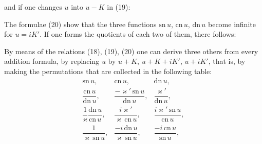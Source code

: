 and if one changes $u$ into $u - K$ in (19):

The formulae (20) show that the three functions $\mathrm{sn}\,u$, $\mathrm{cn}\,u$, $\mathrm{dn}\,u$ become infinite for $u = iK'$. If one forms the quotients of each two of them, there follows:

By means of the relations (18), (19), (20) one can derive three others from every addition formula, by replacing $u$ by $u + K$, $u + K + iK'$, $u + iK'$, that is, by making the permutations that are collected in the following table:
\[
\begin{array}{ccc}
\mathrm{sn}\,u, & \mathrm{cn}\,u, & \mathrm{dn}\,u, \\ \hline
\dfrac{\mathrm{cn}\,u}{\mathrm{dn}\,u}, & \dfrac{-\varkappa'\,\mathrm{sn}\,u}{\mathrm{dn}\,u}, & \dfrac{\varkappa'}{\mathrm{dn}\,u}, \\[2ex]
\dfrac{1}{\varkappa}\dfrac{\mathrm{dn}\,u}{\mathrm{cn}\,u}, & \dfrac{i\varkappa'}{\varkappa\,\mathrm{cn}\,u}, & \dfrac{i\varkappa'\,\mathrm{sn}\,u}{\mathrm{cn}\,u}, \\[2ex]
\dfrac{1}{\varkappa\,\mathrm{sn}\,u}, & \dfrac{-i\,\mathrm{dn}\,u}{\varkappa\,\mathrm{sn}\,u}, & \dfrac{-i\,\mathrm{cn}\,u}{\mathrm{sn}\,u},
\end{array}
\]
